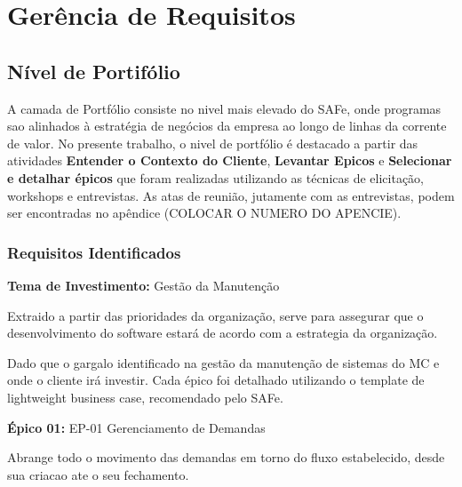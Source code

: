 \chapter[Utilização da Ferramenta de Gerência de Requisitos]{Gerência de Requisitos}

\section{Nível de Portifólio}

A camada de Portfólio consiste no nivel mais elevado do SAFe, onde programas sao alinhados à
estratégia de negócios da empresa ao longo de linhas da corrente de valor. No presente trabalho,
o nivel de portfólio é destacado a partir das atividades \textbf{Entender o Contexto do Cliente},
\textbf{Levantar Epicos} e \textbf{Selecionar e detalhar épicos} que foram realizadas utilizando as
técnicas de elicitação, workshops e entrevistas. As atas de reunião, jutamente com as entrevistas,
podem ser encontradas no apêndice (COLOCAR O NUMERO DO APENCIE).

\subsection{Requisitos Identificados}

\textbf{Tema de Investimento:} Gestão da Manutenção

Extraido a partir das prioridades da organização, serve para assegurar que o desenvolvimento
do software estará de acordo com a estrategia da organização.

Dado que o gargalo identificado na gestão da manutenção de sistemas do MC e onde o cliente irá investir.
Cada épico foi detalhado utilizando o template de lightweight business case, recomendado pelo SAFe. \cite{scaleP}

\textbf{Épico 01:} EP-01 Gerenciamento de Demandas

Abrange todo o movimento das demandas em torno do fluxo estabelecido, desde sua criacao ate o seu fechamento.

